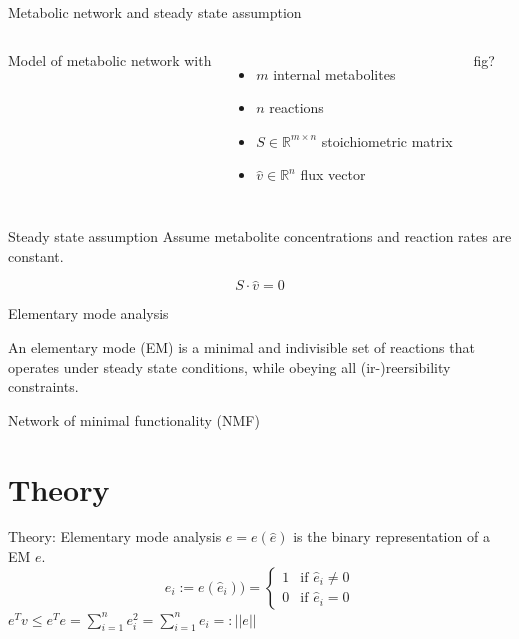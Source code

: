 \documentclass{beamer}
\begin{document}
\begin{frame}{Metabolic network and steady state assumption}
    \begin{columns}
        Model of metabolic network with
        \begin{itemize}
            \item $m$ internal metabolites
            \item $n$ reactions
            \item $S \in \mathbb{R}^{m\times n}$ stoichiometric matrix
            \item $\hat{v} \in \mathbb{R}^{n}$ flux vector
        \end{itemize}
        fig?
    \end{columns}
    
    \begin{block}{Steady state assumption}
        Assume metabolite concentrations and reaction rates are constant.
    \end{block}
    \begin{equation}
    S \cdot \hat{v} = 0 
    \end{equation}
\end{frame}

\begin{frame}{Elementary mode analysis}
    \begin{definition}
        An elementary mode (EM) is a minimal and indivisible set 
        of reactions that operates under steady state conditions, 
        while obeying all (ir-)reersibility constraints.
    \end{definition}
\end{frame}

\begin{frame}{Network of minimal functionality (NMF)}
    
\end{frame}


\section{Theory}
\begin{frame}{Theory: Elementary mode analysis}
    $e = e(\hat{e}) $ is the binary representation of a EM $e$.
    \begin{equation}
        e_{i} := e(\hat{e}_{i})) = 
        \begin{cases}
            1 & \text{if }  \hat{e}_{i} \neq 0 \\
            0 & \text{if }  \hat{e}_{i} = 0 
        \end{cases}
    \end{equation}
    $ e^{T}v \leq e^{T}e = \sum_{i=1}^{n} e_{i}^{2} = \sum_{i=1}^{n} e_{i} =: ||e||$

\end{frame}
\end{document}
